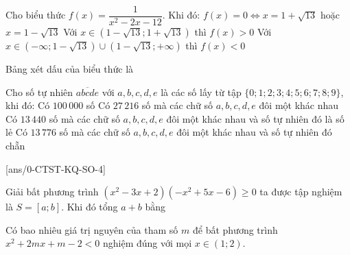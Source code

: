 \begin{ex}%
	Cho biểu thức $f(x)=\dfrac{1}{x^2-2x-12}$. Khi đó:
	\choiceTF
	{$f(x)=0\Leftrightarrow x=1+\sqrt{13}$ hoặc $x=1-\sqrt{13}$}
	{Với $x \in(1-\sqrt{13}; 1+\sqrt{13})$ thì $f(x) > 0$}
	{Với $x \in(-\infty; 1-\sqrt{13}) \cup(1-\sqrt{13};+\infty)$ thì $f(x) < 0$}
	{\True Bảng xét dấu của biểu thức là\\
		}
	\loigiai{
		
	}
\end{ex}

\begin{ex}%
	Cho số tự nhiên $\overline{a b c d e}$ với $a, b, c, d, e$ là các số lấy từ tập $\{0; 1; 2; 3; 4; 5; 6; 7; 8; 9\}$, khi đó:
	\choiceTF
	{Có $100\,000$ số}
	{\True Có $27\,216$ số mà các chữ số $a, b, c, d, e$ đôi một khác nhau}
	{\True Có $13\,440$ số mà các chữ số $a, b, c, d, e$ đôi một khác nhau và số tự nhiên đó là số lẻ}
	{\True Có $13\,776$ số mà các chữ số $a, b, c, d, e$ đôi một khác nhau và số tự nhiên đó chẵn}
	\loigiai{
		
	}
\end{ex}


\caukq
{}[ans/0-CTST-KQ-SO-4]
\setcounter{ex}{0}

\begin{ex}%
	Giải bất phương trình $\left(x^2-3x+2\right)\left(-x^2+5x-6\right) \geq 0$ ta được tập nghiệm là $S=[a;b]$. Khi đó tổng $a+b$ bằng
	\loigiai{
		
	}
\end{ex}

\begin{ex}%
	Có bao nhiêu giá trị nguyên của tham số $m$ để bất phương trình $x^2+2m x+m-2< 0$ nghiệm đúng với mọi $x \in(1; 2)$.
	\loigiai{
	
	}
\end{ex}

